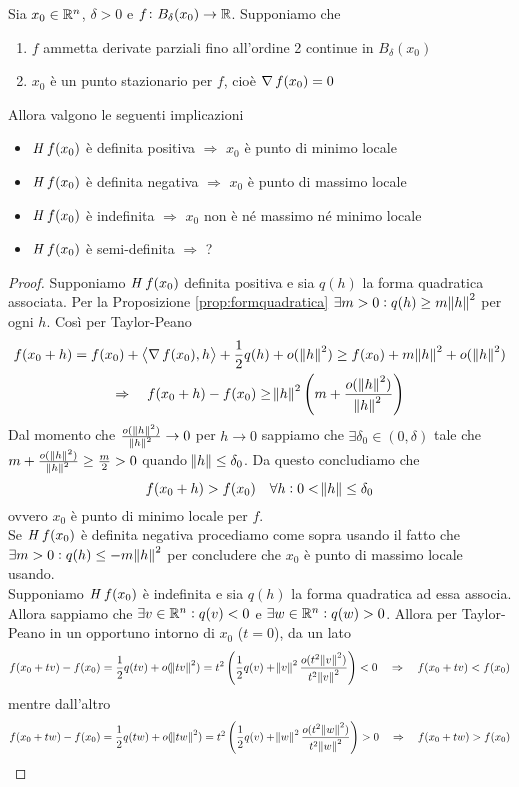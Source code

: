 \begin{thm}
	Sia $ x_0 \in \mathbb{R}^n $, $ \delta > 0 $ e $ f \colon B_{\delta}(x_0) \to \mathbb{R} $. Supponiamo che 
	\begin{enumerate}[label = (\roman*)]
		\item $ f $ ammetta derivate parziali fino all'ordine 2 continue in $ B_{\delta}(x_0) $
		\item $ x_0 $ è un punto stazionario per $ f $, cioè $ \operatorname{\nabla}{f}(x_0) = 0 $
	\end{enumerate}
	Allora valgono le seguenti implicazioni
	\begin{itemize}
		\item $ \operatorname{\mathit{H}}{f}(x_0) $ è definita positiva $ \Rightarrow $ $ x_0 $ è punto di minimo locale
		\item $ \operatorname{\mathit{H}}{f}(x_0) $ è definita negativa $ \Rightarrow $ $ x_0 $ è punto di massimo locale
		\item $ \operatorname{\mathit{H}}{f}(x_0) $ è indefinita $ \Rightarrow $ $ x_0 $ non è né massimo né minimo locale
		\item $ \operatorname{\mathit{H}}{f}(x_0) $ è semi-definita $ \Rightarrow $ ?
	\end{itemize}
\end{thm}
%
\begin{proof}
	Supponiamo $ \operatorname{\mathit{H}}{f}(x_0) $ definita positiva e sia $ q(h) $ la forma quadratica associata. Per la Proposizione \ref{prop:formquadratica} $ \exists m > 0 : q(h) \geq m \norm{h}^2 $ per ogni $ h $. Così per Taylor-Peano
	\begin{gather*}
		f(x_0 + h) = f(x_0) + \left\langle \operatorname{\nabla}{f}(x_0), h \right\rangle + \frac{1}{2} q(h) + o(\,\norm{h}^2) \geq f(x_0) + m \norm{h}^2 + o(\,\norm{h}^2) \\
		\Rightarrow \quad f(x_0 + h) - f(x_0) \geq \norm{h}^2 \left(m + \frac{o(\,\norm{h}^2)}{\norm{h}^2}\right)
	\end{gather*}
	Dal momento che $ \frac{o(\,\norm{h}^2)}{\norm{h}^2} \to 0 $ per $ h \to 0 $ sappiamo che $ \exists \delta_0 \in (0, \delta) $ tale che $ m + \frac{o(\,\norm{h}^2)}{\norm{h}^2} \geq \frac{m}{2} > 0 $ quando $ \norm{h} \leq \delta_0 $. Da questo concludiamo che 
	\[
		f(x_0 + h) > f(x_0) \quad \forall h : 0 < \norm{h} \leq \delta_0
	\]
	ovvero $ x_0 $ è punto di minimo locale per $ f $. \\
	Se $ \operatorname{\mathit{H}}{f}(x_0) $ è definita negativa procediamo come sopra usando il fatto che $ \exists m > 0 : q(h) \leq -m \norm{h}^2 $ per concludere che $ x_0 $ è punto di massimo locale usando. \\
	Supponiamo $ \operatorname{\mathit{H}}{f}(x_0) $ è indefinita e sia $ q(h) $ la forma quadratica ad essa associa. Allora sappiamo che $ \exists v \in \mathbb{R}^n : q(v) < 0 $ e $ \exists w \in \mathbb{R}^n : q(w) > 0 $. Allora per Taylor-Peano in un opportuno intorno di $ x_0 $ ($ t = 0 $), da un lato 
	\[
		f(x_0 + tv) - f(x_0) = \frac{1}{2} q(tv) + o(\norm{tv}^2) = t^2 \left(\frac{1}{2}q(v) + \norm{v}^2 \frac{o(t^2\norm{v}^2)}{t^2\norm{v}^2}\right) < 0 \quad \Rightarrow \quad f(x_0 + tv) < f(x_0)
	\]
	mentre dall'altro
	\[
		f(x_0 + tw) - f(x_0) = \frac{1}{2} q(tw) + o(\norm{tw}^2) = t^2 \left(\frac{1}{2}q(v) + \norm{w}^2 \frac{o(t^2\norm{w}^2)}{t^2\norm{w}^2}\right) > 0 \quad \Rightarrow \quad f(x_0 + tw) > f(x_0)\qedhere
	\]
\end{proof}

